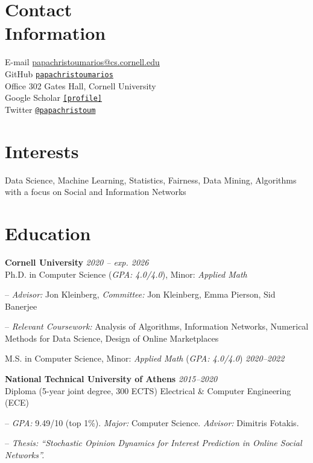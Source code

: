 \documentclass[margin]{res}
\newcommand{\field}[2]{\noindent \textbf{#1} \hfill #2 \\}
\newcommand{\specialurl}[2]{\href {#2} {\texttt{[#1]}}}
\begin{document}
\begin{resume}

\section{Contact \\ Information} 
E-mail \hfill \url{papachristoumarios@cs.cornell.edu} \\
GitHub \hfill \href{http://github.com/papachristoumarios}{\nolinkurl{papachristoumarios}} \\
Office \hfill 302 Gates Hall, Cornell University \\
Google Scholar \hfill \specialurl{profile}{https://scholar.google.gr/citations?user=T12JO3MAAAAJ&hl=en} \\
Twitter \hfill \href{https://twitter.com/papachristoum}{\nolinkurl {@papachristoum}}


\section{Interests} Data Science, Machine Learning, Statistics, Fairness, Data Mining, Algorithms with a focus on Social and Information Networks 

\section{Education}
\field {Cornell University} {\emph{2020 -- exp. 2026}}
Ph.D. in Computer Science (\emph{GPA: 4.0/4.0}), Minor: \emph{Applied Math}
\begin{compactitem}
\item[--] \emph{Advisor:} Jon Kleinberg, \emph{Committee:} Jon Kleinberg, Emma Pierson, Sid Banerjee 
\item[--] \emph{Relevant Coursework:} Analysis of Algorithms, Information Networks, Numerical Methods for Data Science, Design of Online Marketplaces
\end{compactitem} 

M.S. in Computer Science, Minor: \emph{Applied Math} (\emph{GPA: 4.0/4.0}) \hfill {\emph{2020--2022}}
 
\field{National Technical University of Athens}  {\emph{2015--2020}} 
Diploma (5-year joint degree, 300 ECTS) Electrical \& Computer Engineering (ECE)
\begin{compactitem}
\item[--] \emph{GPA:} 9.49/10 (top 1\%). \emph{Major:} Computer Science. \emph{Advisor:} Dimitris Fotakis.
\item[--] \emph{Thesis: ``Stochastic Opinion Dynamics for Interest Prediction in Online Social Networks''.}
\end{compactitem} 



\end{resume}
\end{document}
